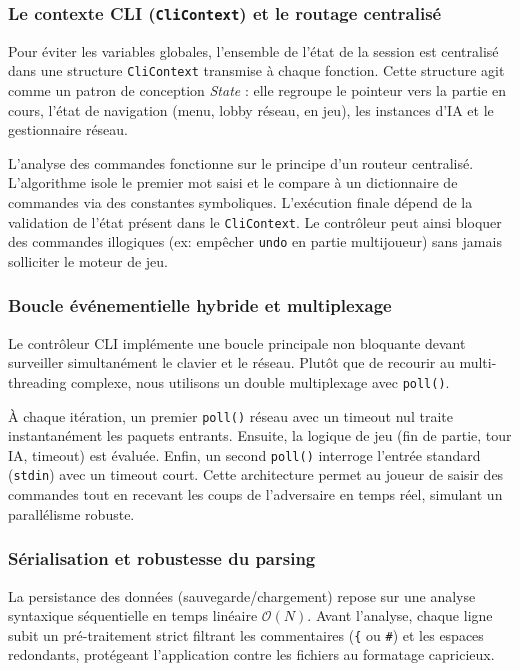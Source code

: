 \documentclass[a4paper]{article}
\begin{document}
\subsubsection{Le contexte CLI (\texttt{CliContext}) et le routage centralisé}
Pour éviter les variables globales, l'ensemble de l'état de la session est centralisé dans une structure \texttt{CliContext} transmise à chaque fonction. Cette structure agit comme un patron de conception \textit{State} : elle regroupe le pointeur vers la partie en cours, l'état de navigation (menu, lobby réseau, en jeu), les instances d'IA et le gestionnaire réseau.

L'analyse des commandes fonctionne sur le principe d'un routeur centralisé. L'algorithme isole le premier mot saisi et le compare à un dictionnaire de commandes via des constantes symboliques. L'exécution finale dépend de la validation de l'état présent dans le \texttt{CliContext}. Le contrôleur peut ainsi bloquer des commandes illogiques (ex: empêcher \texttt{undo} en partie multijoueur) sans jamais solliciter le moteur de jeu.

\subsubsection{Boucle événementielle hybride et multiplexage}
Le contrôleur CLI implémente une boucle principale non bloquante devant surveiller simultanément le clavier et le réseau. Plutôt que de recourir au multi-threading complexe, nous utilisons un double multiplexage avec \texttt{poll()}. 

À chaque itération, un premier \texttt{poll()} réseau avec un timeout nul traite instantanément les paquets entrants. Ensuite, la logique de jeu (fin de partie, tour IA, timeout) est évaluée. Enfin, un second \texttt{poll()} interroge l'entrée standard (\texttt{stdin}) avec un timeout court. Cette architecture permet au joueur de saisir des commandes tout en recevant les coups de l'adversaire en temps réel, simulant un parallélisme robuste.

\subsubsection{Sérialisation et robustesse du parsing}
La persistance des données (sauvegarde/chargement) repose sur une analyse syntaxique séquentielle en temps linéaire $\mathcal{O}(N)$. Avant l'analyse, chaque ligne subit un pré-traitement strict filtrant les commentaires (\texttt{\{} ou \texttt{\#}) et les espaces redondants, protégeant l'application contre les fichiers au formatage capricieux.
\end{document}
